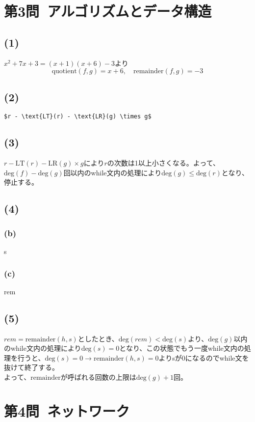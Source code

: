 \documentclass[a4paper,12pt,xelatex,ja=standard]{bxjsarticle}
\begin{document}
\section*{第3問\ アルゴリズムとデータ構造}
\subsection*{(1)}
$x^2 + 7x + 3 = (x + 1)(x + 6) - 3$より
\[
  \text{quotient}(f, g) = x + 6,\quad \text{remainder}(f, g) = -3
\]

\subsection*{(2)}
\begin{lstlisting}[mathescape]
  $r - \text{LT}(r) - \text{LR}(g) \times g$
\end{lstlisting}

\subsection*{(3)}
$r - \text{LT}(r) - \text{LR}(g) \times g$により$r$の次数は1以上小さくなる。よって、$\text{deg}(f) - \text{deg}(g)$回以内のwhile文内の処理により$\text{deg}(g) \leq \text{deg}(r)$となり、停止する。

\subsection*{(4)}
\subsubsection*{(b)}
s

\subsubsection*{(c)}
rem

\subsection*{(5)}
$rem = \text{remainder}(h, s)$としたとき、$\text{deg}(rem) < \text{deg}(s)$より、$\text{deg}(g)$以内のwhile文内の処理により$\text{deg}(s) = 0$となり、この状態でもう一度while文内の処理を行うと、$\text{deg}(s) = 0 \to \text{remainder}(h, s) = 0$よりsが0になるのでwhile文を抜けて終了する。\\
よって、$\text{remainder}$が呼ばれる回数の上限は$\text{deg}(g) + 1$回。

\section*{第4問\ ネットワーク}
\end{document}
